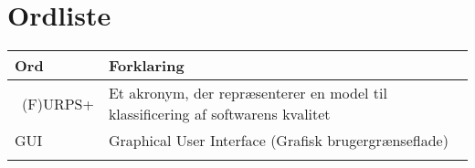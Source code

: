 \chapter{Ordliste}


\begin{longtabu} to 
    Ord &    Forklaring\\
    \toprule \
    (F)URPS+ &    Et akronym, der repræsenterer en model til klassificering af softwarens kvalitet\\
    GUI		&	Graphical User Interface (Grafisk brugergrænseflade)\\
 
\label{forkort}
\end{longtabu}